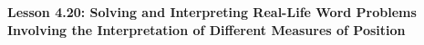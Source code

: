 \begin{center}
\textbf{Lesson 4.20: Solving and Interpreting Real-Life Word Problems Involving the Interpretation of Different Measures of Position}
\end{center}

\vspace*{-1.5ex}

